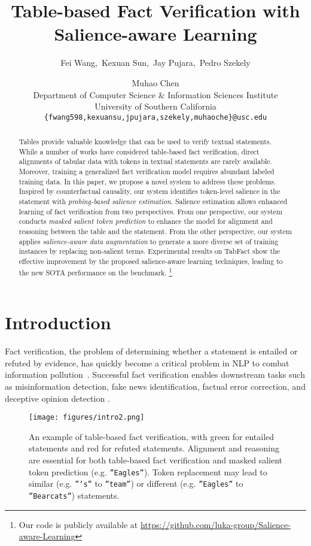 \documentclass[11pt]{article}
\title{Table-based Fact Verification with Salience-aware Learning}
\author{Fei Wang,\;~Kexuan Sun,\;~Jay Pujara,\;~Pedro Szekely \and Muhao Chen \\
  Department of Computer Science \& Information Sciences Institute\\
  University of Southern California \\
\texttt{\{fwang598,kexuansu,jpujara,szekely,muhaoche\}@usc.edu} 
  }
\date{}
\begin{document}
\maketitle

\begin{abstract}

Tables provide valuable knowledge that can be used to verify textual statements.
While a number of works have considered table-based fact verification, direct alignments of tabular data with tokens in textual statements are rarely available.
Moreover, training a generalized fact verification model requires abundant labeled training data.
In this paper, we propose a novel system to address these problems.
Inspired by counterfactual causality, our system identifies token-level salience in the statement with \textit{probing-based salience estimation}. 
Salience estimation allows enhanced learning of fact verification from two perspectives.
From one perspective, our system conducts \textit{masked salient token prediction} to enhance the model for alignment and reasoning between the table and the statement.
From the other perspective, our system applies \textit{salience-aware data augmentation} to generate a more diverse set of training instances by replacing non-salient terms. 
Experimental results on TabFact show the effective improvement by the proposed salience-aware learning techniques, 
leading to the new SOTA performance on the benchmark.
\footnote{Our code is publicly available at \url{https://github.com/luka-group/Salience-aware-Learning}}

\end{abstract} \section{Introduction}




Fact verification, the problem of determining whether a statement is entailed or refuted by evidence, has quickly become a critical problem in NLP to combat information pollution~\cite{rashkin2017truth,thorne2018fever,zhang2019evidence, zellers2019defending, wadden2020fact}. 
Successful fact verification enables downstream tasks such as misinformation detection, fake news identification, factual error correction, and deceptive opinion detection \cite{ott2011finding, shu2017fake, yoon2019detecting, cao2020factual}.




\begin{figure}[t]
\centering
\texttt{[image: figures/intro2.png]}
\caption{
An example of table-based fact verification, 
with green for entailed statements and red for refuted statements.
Alignment and reasoning are essential for both table-based fact verification and masked salient token prediction (e.g. \texttt{''Eagles''}).
Token replacement may lead to similar (e.g. \texttt{'''s''} to \texttt{''team''}) or different (e.g. \texttt{''Eagles''} to \texttt{''Bearcats''}) statements.
}
\label{fig:intro}
\end{figure}
\end{document}
